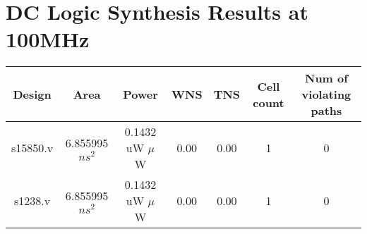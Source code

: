 \documentclass[letterpaper, 11pt]{article}
\begin{document}
\section{DC Logic Synthesis Results at 100MHz}

\begin{tabular}{ |c|c|c|c|c|c|c| }
	\hline
	Design & Area & Power & WNS & TNS & Cell count & Num of violating paths \\
	\hline
	s15850.v & 6.855995 $ns^2$ & 0.1432 uW $\mu$W & 0.00 & 0.00 & 1 & 0 \\
	s1238.v & 6.855995 $ns^2$ & 0.1432 uW $\mu$W & 0.00 & 0.00 & 1 & 0 \\
	
	
\end{tabular}
\end{document}
